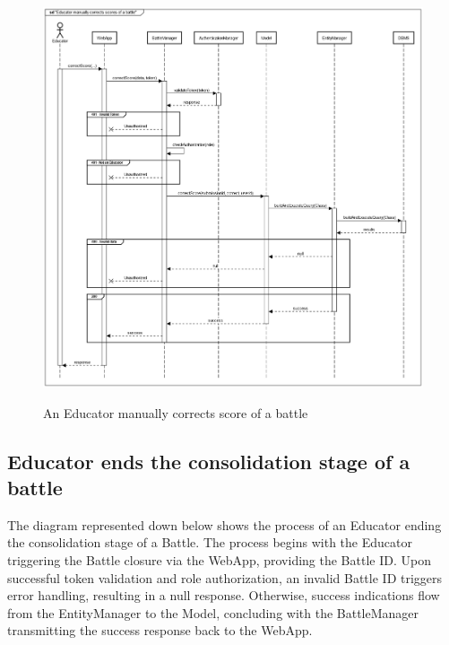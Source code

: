 \documentclass{Configuration_Files/Template}
\begin{document}
\begin{figure}[H]
\centering
\includegraphics[scale = 0.33]{Images/diagrams/sequences/educatorCorrectsScore.png}\\
\caption{An Educator manually corrects score of a battle}
\end{figure}

\subsection*{Educator ends the consolidation stage of a battle}

The diagram represented down below shows the process of an Educator ending the consolidation stage of a Battle. The process begins with the Educator triggering the Battle closure via the WebApp, providing the Battle ID. Upon successful token validation and role authorization, an invalid Battle ID triggers error handling, resulting in a null response. Otherwise, success indications flow from the EntityManager to the Model, concluding with the BattleManager transmitting the success response back to the WebApp.
\end{document}
